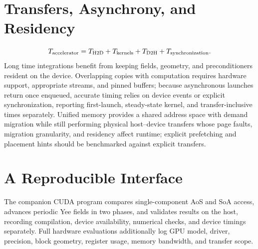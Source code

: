 \section{Transfers, Asynchrony, and Residency}
\[
 T_{\rm accelerator}=T_{\rm H2D}+T_{\rm kernels}
 +T_{\rm D2H}+T_{\rm synchronization}.
\]
Long time integrations benefit from keeping fields, geometry, and preconditioners resident on the device. Overlapping copies with computation requires hardware support, appropriate streams, and pinned buffers; because asynchronous launches return once enqueued, accurate timing relies on device events or explicit synchronization, reporting first-launch, steady-state kernel, and transfer-inclusive times separately.
Unified memory provides a shared address space with demand migration while still performing physical host--device transfers whose page faults, migration granularity, and residency affect runtime; explicit prefetching and placement hints should be benchmarked against explicit transfers.
\section{A Reproducible Interface}
The companion CUDA program compares single-component AoS and SoA access, advances periodic Yee fields in two phases, and validates results on the host, recording compilation, device availability, numerical checks, and device timings separately. Full hardware evaluations additionally log GPU model, driver, precision, block geometry, register usage, memory bandwidth, and transfer scope.
